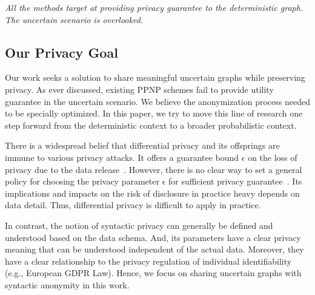 \emph{All the methods target at providing privacy guarantee to the deterministic graph. The uncertain scenario is overlooked.}
\vspace{-5pt}
\subsection{Our Privacy Goal}
Our work seeks a solution to share meaningful uncertain graphs while preserving privacy.
As ever discussed, existing PPNP schemes fail to provide utility guarantee in the uncertain scenario. 
We believe the anonymization process needed to be specially optimized. 
In this paper, we try to move this line of research one step forward from the deterministic context to a broader probabilistic context.

There is a widespread belief that differential privacy and its offsprings are immune to various privacy attacks. It offers a guarantee bound $\epsilon$ on the loss of privacy due to the data release~\cite{Sala_Sharing_2011,Xiao_Differentially_2014}. However, there is no clear way to set a general policy for choosing the privacy parameter $\epsilon$ for sufficient privacy guarantee~\cite{lee2011}. Its implications and impacts on the risk of disclosure in practice heavy depends on data detail. Thus, differential privacy is difficult to apply in practice. 

In contrast, the notion of syntactic privacy can generally be defined and understood based on the data schema. And, its parameters have a clear privacy meaning that can be understood independent of the actual data. Moreover, they have a clear relationship to the privacy regulation of individual identifiability (e.g., European GDPR Law). 
Hence, we focus on sharing uncertain graphs with syntactic anonymity in this work. 



